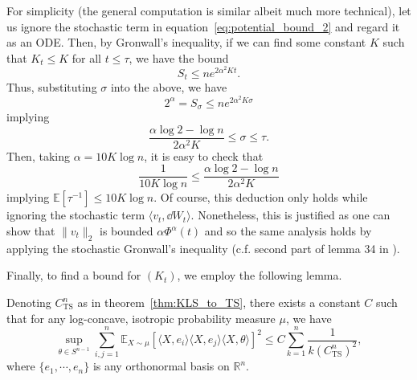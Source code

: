 For simplicity (the general computation is similar albeit much more technical), let us ignore the stochastic term in 
equation~\eqref{eq:potential_bound_2} and regard it as an ODE. Then, by Gronwall's inequality, if we can 
find some constant \(K\) such that \(K_t \le K\) for all \(t \le \tau\), we have the bound
\[S_t \le n e^{2\alpha^2 K t}.\]
Thus, substituting \(\sigma\) into the above, we have 
\[2^\alpha = S_\sigma \le ne^{2\alpha^2 K\sigma}\]
implying 
\[\frac{\alpha \log 2 - \log n}{2\alpha^2 K} \le \sigma \le \tau.\]
Then, taking \(\alpha = 10K\log n\), it is easy to check that 
\[\frac{1}{10K \log n} \le \frac{\alpha \log 2 - \log n}{2\alpha^2 K}\]
implying \(\mathbb{E}[\tau^{-1}] \le 10K \log n\). Of course, this deduction only holds while ignoring the stochastic term 
\(\langle v_t, \dd W_t\rangle\). Nonetheless, this is justified as one can show that \(\|v_t\|_2\) is bounded 
\(\alpha \Phi^\alpha(t)\) and so the same analysis holds by applying the stochastic Gronwall's inequality
(c.f. second part of lemma 34 in \cite{Lee_2018}).

Finally, to find a bound for \((K_t)\), we employ the following lemma.

\begin{lemma}\label{lem:final_bd}
  Denoting \(C_{\text{TS}}^n\) as in theorem~\ref{thm:KLS_to_TS}, there exists a constant \(C\) such that 
  for any log-concave, isotropic probability measure \(\mu\), we have
  \[\sup_{\theta \in S^{n - 1}}\sum_{i, j = 1}^n 
    \mathbb{E}_{X \sim \mu}[\langle X, e_i\rangle \langle X, e_j\rangle \langle X, \theta\rangle]^2 \le 
    C \sum_{k = 1}^n \frac{1}{k(C_{\text{TS}}^n)^2},\]
  where \(\{e_1, \cdots, e_n\}\) is any orthonormal basis on \(\mathbb{R}^n\).
\end{lemma}

